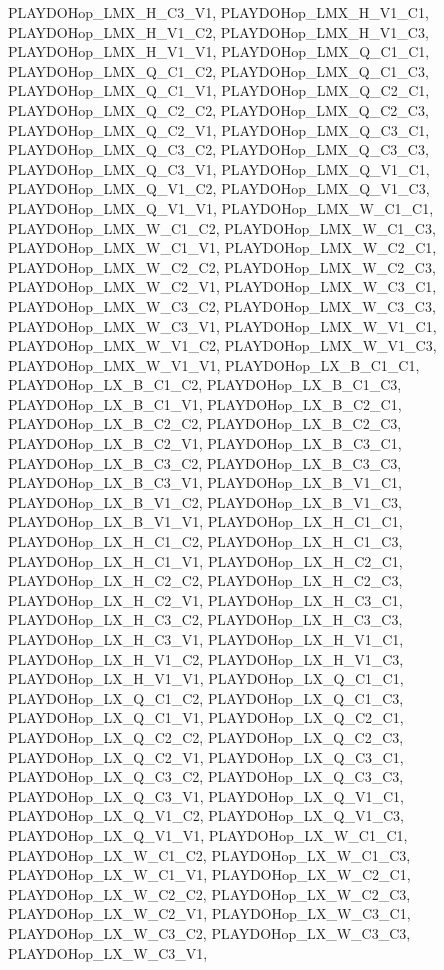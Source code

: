 PLAYDOHop\_\-LMX\_\-H\_\-C3\_\-V1, PLAYDOHop\_\-LMX\_\-H\_\-V1\_\-C1, PLAYDOHop\_\-LMX\_\-H\_\-V1\_\-C2, PLAYDOHop\_\-LMX\_\-H\_\-V1\_\-C3, PLAYDOHop\_\-LMX\_\-H\_\-V1\_\-V1, PLAYDOHop\_\-LMX\_\-Q\_\-C1\_\-C1, PLAYDOHop\_\-LMX\_\-Q\_\-C1\_\-C2, PLAYDOHop\_\-LMX\_\-Q\_\-C1\_\-C3, PLAYDOHop\_\-LMX\_\-Q\_\-C1\_\-V1, PLAYDOHop\_\-LMX\_\-Q\_\-C2\_\-C1, PLAYDOHop\_\-LMX\_\-Q\_\-C2\_\-C2, PLAYDOHop\_\-LMX\_\-Q\_\-C2\_\-C3, PLAYDOHop\_\-LMX\_\-Q\_\-C2\_\-V1, PLAYDOHop\_\-LMX\_\-Q\_\-C3\_\-C1, PLAYDOHop\_\-LMX\_\-Q\_\-C3\_\-C2, PLAYDOHop\_\-LMX\_\-Q\_\-C3\_\-C3, PLAYDOHop\_\-LMX\_\-Q\_\-C3\_\-V1, PLAYDOHop\_\-LMX\_\-Q\_\-V1\_\-C1, PLAYDOHop\_\-LMX\_\-Q\_\-V1\_\-C2, PLAYDOHop\_\-LMX\_\-Q\_\-V1\_\-C3, PLAYDOHop\_\-LMX\_\-Q\_\-V1\_\-V1, PLAYDOHop\_\-LMX\_\-W\_\-C1\_\-C1, PLAYDOHop\_\-LMX\_\-W\_\-C1\_\-C2, PLAYDOHop\_\-LMX\_\-W\_\-C1\_\-C3, PLAYDOHop\_\-LMX\_\-W\_\-C1\_\-V1, PLAYDOHop\_\-LMX\_\-W\_\-C2\_\-C1, PLAYDOHop\_\-LMX\_\-W\_\-C2\_\-C2, PLAYDOHop\_\-LMX\_\-W\_\-C2\_\-C3, PLAYDOHop\_\-LMX\_\-W\_\-C2\_\-V1, PLAYDOHop\_\-LMX\_\-W\_\-C3\_\-C1, PLAYDOHop\_\-LMX\_\-W\_\-C3\_\-C2, PLAYDOHop\_\-LMX\_\-W\_\-C3\_\-C3, PLAYDOHop\_\-LMX\_\-W\_\-C3\_\-V1, PLAYDOHop\_\-LMX\_\-W\_\-V1\_\-C1, PLAYDOHop\_\-LMX\_\-W\_\-V1\_\-C2, PLAYDOHop\_\-LMX\_\-W\_\-V1\_\-C3, PLAYDOHop\_\-LMX\_\-W\_\-V1\_\-V1, PLAYDOHop\_\-LX\_\-B\_\-C1\_\-C1, PLAYDOHop\_\-LX\_\-B\_\-C1\_\-C2, PLAYDOHop\_\-LX\_\-B\_\-C1\_\-C3, PLAYDOHop\_\-LX\_\-B\_\-C1\_\-V1, PLAYDOHop\_\-LX\_\-B\_\-C2\_\-C1, PLAYDOHop\_\-LX\_\-B\_\-C2\_\-C2, PLAYDOHop\_\-LX\_\-B\_\-C2\_\-C3, PLAYDOHop\_\-LX\_\-B\_\-C2\_\-V1, PLAYDOHop\_\-LX\_\-B\_\-C3\_\-C1, PLAYDOHop\_\-LX\_\-B\_\-C3\_\-C2, PLAYDOHop\_\-LX\_\-B\_\-C3\_\-C3, PLAYDOHop\_\-LX\_\-B\_\-C3\_\-V1, PLAYDOHop\_\-LX\_\-B\_\-V1\_\-C1, PLAYDOHop\_\-LX\_\-B\_\-V1\_\-C2, PLAYDOHop\_\-LX\_\-B\_\-V1\_\-C3, PLAYDOHop\_\-LX\_\-B\_\-V1\_\-V1, PLAYDOHop\_\-LX\_\-H\_\-C1\_\-C1, PLAYDOHop\_\-LX\_\-H\_\-C1\_\-C2, PLAYDOHop\_\-LX\_\-H\_\-C1\_\-C3, PLAYDOHop\_\-LX\_\-H\_\-C1\_\-V1, PLAYDOHop\_\-LX\_\-H\_\-C2\_\-C1, PLAYDOHop\_\-LX\_\-H\_\-C2\_\-C2, PLAYDOHop\_\-LX\_\-H\_\-C2\_\-C3, PLAYDOHop\_\-LX\_\-H\_\-C2\_\-V1, PLAYDOHop\_\-LX\_\-H\_\-C3\_\-C1, PLAYDOHop\_\-LX\_\-H\_\-C3\_\-C2, PLAYDOHop\_\-LX\_\-H\_\-C3\_\-C3, PLAYDOHop\_\-LX\_\-H\_\-C3\_\-V1, PLAYDOHop\_\-LX\_\-H\_\-V1\_\-C1, PLAYDOHop\_\-LX\_\-H\_\-V1\_\-C2, PLAYDOHop\_\-LX\_\-H\_\-V1\_\-C3, PLAYDOHop\_\-LX\_\-H\_\-V1\_\-V1, PLAYDOHop\_\-LX\_\-Q\_\-C1\_\-C1, PLAYDOHop\_\-LX\_\-Q\_\-C1\_\-C2, PLAYDOHop\_\-LX\_\-Q\_\-C1\_\-C3, PLAYDOHop\_\-LX\_\-Q\_\-C1\_\-V1, PLAYDOHop\_\-LX\_\-Q\_\-C2\_\-C1, PLAYDOHop\_\-LX\_\-Q\_\-C2\_\-C2, PLAYDOHop\_\-LX\_\-Q\_\-C2\_\-C3, PLAYDOHop\_\-LX\_\-Q\_\-C2\_\-V1, PLAYDOHop\_\-LX\_\-Q\_\-C3\_\-C1, PLAYDOHop\_\-LX\_\-Q\_\-C3\_\-C2, PLAYDOHop\_\-LX\_\-Q\_\-C3\_\-C3, PLAYDOHop\_\-LX\_\-Q\_\-C3\_\-V1, PLAYDOHop\_\-LX\_\-Q\_\-V1\_\-C1, PLAYDOHop\_\-LX\_\-Q\_\-V1\_\-C2, PLAYDOHop\_\-LX\_\-Q\_\-V1\_\-C3, PLAYDOHop\_\-LX\_\-Q\_\-V1\_\-V1, PLAYDOHop\_\-LX\_\-W\_\-C1\_\-C1, PLAYDOHop\_\-LX\_\-W\_\-C1\_\-C2, PLAYDOHop\_\-LX\_\-W\_\-C1\_\-C3, PLAYDOHop\_\-LX\_\-W\_\-C1\_\-V1, PLAYDOHop\_\-LX\_\-W\_\-C2\_\-C1, PLAYDOHop\_\-LX\_\-W\_\-C2\_\-C2, PLAYDOHop\_\-LX\_\-W\_\-C2\_\-C3, PLAYDOHop\_\-LX\_\-W\_\-C2\_\-V1, PLAYDOHop\_\-LX\_\-W\_\-C3\_\-C1, PLAYDOHop\_\-LX\_\-W\_\-C3\_\-C2, PLAYDOHop\_\-LX\_\-W\_\-C3\_\-C3, PLAYDOHop\_\-LX\_\-W\_\-C3\_\-V1, 